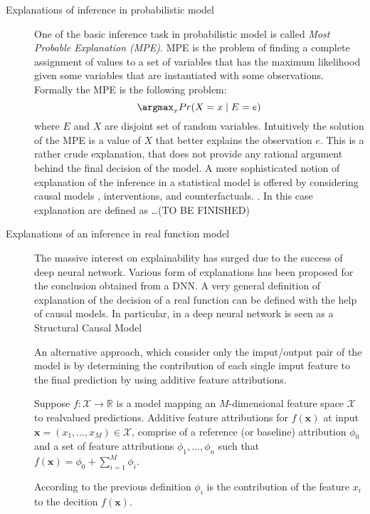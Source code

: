 \begin{description}
\item[Explanations of inference in probabilistic model] One of the
  basic inference task in probabilistic model is called \emph{Most
    Probable Explanation (MPE)}. MPE is the problem of finding a
  complete assignment of values to a set of variables that has the maximum
  likelihood given some variables that are instantiated with some
  observations. Formally the MPE is the following problem:
  $$
  \argmax_{x}Pr(X=x\mid E=e)
  $$
  where $E$ and $X$ are disjoint set of random variables. Intuitively
  the solution of the MPE is a value of $X$ that better explains the
  observation $e$. This is a rather crude explanation, that does not
  provide any rational argument behind the final decision of the
  model. A more sophisticated notion of explanation of the inference
  in a statistical model is offered by considering causal models
  \cite{pearl2009causality}, interventions, and counterfactuals.
  \cite{chajewska2013defining,halpern2005causes1,halpern2005causes2,%
    sprenger2018foundations,peters2017elements}.  In this case
  explanation are defined as \dots (TO BE FINISHED)

\item[Explanations of an inference in real function model]
  The massive interest on explainability has surged due to the success
  of deep neural network. Various form of explanations has been
  proposed for the conclusion obtained from a DNN.  A very general
  definition of explanation of the decision of a real function can be
  defined with the help of causal models.
  In particular, in \cite{chattopadhyay2019neural} a deep neural
  network is seen as a Structural Causal Model \cite{pearl2009causality}

  An alternative approach, which consider only the imput/output pair
  of the model is by determining the contribution of each single imput
  feature to the final prediction by using additive feature
  attributions. 

  \begin{definition}
      Suppose $f:\mathcal{X} \rightarrow\mathbb{R}$
is a model mapping an $M$-dimensional feature space $\mathcal{X}$ to realvalued
predictions. Additive feature attributions for $f(\mathbf{x})$ at
input $\mathbf{x}=(x_1,\dots,x_M)\in\mathcal{X}$, 
comprise of a reference (or baseline) attribution $\phi_0$ and a set
of feature attributions $\phi_1,\dots,\phi_n$ such that $f(\mathbf{x}) =
\phi_0+\sum_{i=1}^M\phi_i$. 
\end{definition}
According to the previous definition $\phi_i$ is the contribution of
the feature $x_i$ to the decition $f(\mathbf{x})$. 



\end{description}
